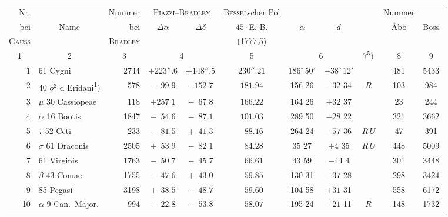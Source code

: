 \documentclass[12pt,a4paper]{article}
\theoremstyle{plain}
\theoremstyle{definition}
\theoremstyle{remark}
\begin{document}
\medskip
\begin{small}
\begin{center}
\begin{tabular}{|r|l|r|cc|c|cc|c|c|c|}
\hline
Nr. & & Nummer & \multicolumn{2}{c|}{\textsc{Piazzi--Bradley}} & \textsc{Bessel}scher Pol & \multicolumn{2}{c|}{} & & Nummer \\
bei & \multicolumn{1}{c|}{Name} & bei & $\Delta\alpha$ & $\Delta\delta$ & $45\cdot$E.-B. & \multicolumn{1}{c}{$\alpha$} & \multicolumn{1}{c|}{$d$} & & \AA bo & Boss \\
\textsc{Gau\ss} & & \textsc{Bradley} & & & (1777,5) & & & & & \\
\hline
\multicolumn{1}{|c|}{1} & \multicolumn{1}{c|}{2} & \multicolumn{1}{c|}{3} & \multicolumn{2}{c|}{4} & \multicolumn{1}{c|}{5} & \multicolumn{2}{c|}{6} & \multicolumn{1}{c|}{$7^{5})$} & \multicolumn{1}{c|}{8} & \multicolumn{1}{c|}{9} \\
\hline
 1 & 61 Cygni & 2744 & $+223''\!\!.6$ & $+148''\!\!.5$ & $230''\!\!.21$ & $186^{\circ}\,50'$ & $+38^{\circ}\,12'$ & & 481 & 5433 \\
 2 & 40 $o^{2}$ d Eridani\textsuperscript{1}) & 578 & $-\phantom{0}99.9$ & $-152.7$ & $181.94$ & 156 26 & $-32$ 34 & $R$ & 103 & 984 \\
 3 & $\mu$ 30 Cassiopeae & 118 & $+257.1$ & $-\phantom{0}67.8$ & $166.22$ & 164 26 & $+32$ 37 & & 23 & 244 \\
 4 & $\alpha$ 16 Bootis & 1847 & $-\phantom{0}54.6$ & $-\phantom{0}87.1$ & $101.03$ & 289 50 & $-28$ 22 & & 321 & 3662 \\
 5 & $\tau$ 52 Ceti & 233 & $-\phantom{0}81.5$ & $+\phantom{0}41.3$ & $\phantom{0}88.16$ & 264 24 & $-57$ 36 & $R\,U$ & 47 & 391 \\
 6 & $\sigma$ 61 Draconis & 2505 & $+\phantom{0}53.9$ & $-\phantom{0}82.1$ & $\phantom{0}84.28$ & 35 27 & $+4$ 35 & $R\,U$ & 448 & 5009 \\
 7 & 61 Virginis & 1763 & $-\phantom{0}50.7$ & $-\phantom{0}45.7$ & $\phantom{0}66.61$ & 43 59 & $-44$ \phantom{0}4 & & 301 & 3448 \\
 8 & $\beta$ 43 Comae & 1755 & $-\phantom{0}47.6$ & $+\phantom{0}43.0$ & $\phantom{0}59.85$ & 130 31 & $-37$ 28 & & 298 & 3424 \\
 9 & 85 Pegasi & 3198 & $+\phantom{0}38.5$ & $-\phantom{0}48.7$ & $\phantom{0}59.60$ & 104 58 & $+31$ 31 & & 558 & 6172 \\
10 & $\alpha$ 9 Can.~Major. & 994 & $-\phantom{0}22.8$ & $-\phantom{0}53.8$ & $\phantom{0}58.07$ & 195 24 & $-21$ 11 & $R$ & 148 & 1732 \\
\hline
\end{tabular}
\end{center}
\end{small}
\end{document}
